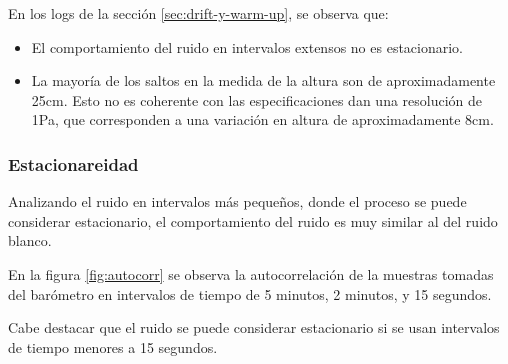 \documentclass[main]{subfiles}
\begin{document}
En los logs de la sección \ref{sec:drift-y-warm-up}, se observa que:
\begin{itemize}
\item El comportamiento del ruido en intervalos extensos no es estacionario.
\item La mayoría de los saltos en la medida de la altura son de aproximadamente 25cm. Esto no es coherente con las especificaciones dan una resolución de 1Pa, que corresponden a una variación en altura de aproximadamente 8cm.
\end{itemize}

\subsubsection{Estacionareidad}

Analizando el ruido en intervalos más pequeños, donde el proceso se puede considerar estacionario, el comportamiento del ruido es muy similar al del ruido blanco.

En la figura \ref{fig:autocorr} se observa la autocorrelación de la muestras tomadas del barómetro en intervalos de tiempo de 5 minutos, 2 minutos, y 15 segundos.

Cabe destacar que el ruido se puede considerar estacionario si se usan intervalos de tiempo menores a 15 segundos.
\end{document}
